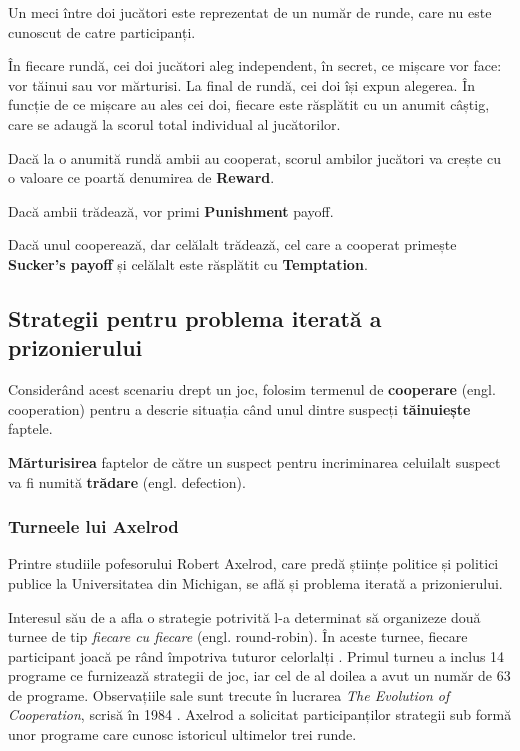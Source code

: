Un meci între doi jucători este reprezentat de un număr de runde, care nu este cunoscut de catre participanți.

În fiecare rundă, cei doi jucători aleg independent, în secret, ce mișcare vor face: vor tăinui sau vor mărturisi. La final de rundă, cei doi își expun alegerea. În funcție de ce mișcare au ales cei doi, fiecare este răsplătit cu un anumit câștig, care se adaugă la scorul total individual al jucătorilor. 

Dacă la o anumită rundă ambii au cooperat, scorul ambilor jucători va crește cu o valoare ce poartă denumirea de \textbf{Reward}. 

Dacă ambii trădează, vor primi \textbf{Punishment} payoff. 

Dacă unul cooperează, dar celălalt trădează, cel care a cooperat primește \textbf{Sucker's payoff} și celălalt este răsplătit cu \textbf{Temptation}. 

\subsection {Strategii pentru problema iterată a prizonierului}

Considerând acest scenariu drept un joc, folosim termenul de \textbf{cooperare} (engl. cooperation) pentru a descrie situația când unul dintre suspecți \textbf{tăinuiește} faptele. 

\textbf{Mărturisirea} faptelor de către un suspect pentru incriminarea celuilalt suspect va fi numită \textbf{trădare} (engl. defection). 

\subsubsection{Turneele lui Axelrod}

Printre studiile pofesorului Robert Axelrod, care predă științe politice și politici publice la Universitatea din Michigan, se află și problema iterată a prizonierului.

Interesul său de a afla o strategie potrivită l-a determinat să organizeze două turnee de tip \textit{fiecare cu fiecare} (engl. round-robin). În aceste turnee, fiecare participant joacă pe rând împotriva tuturor celorlalți \cite{round_robin_dictionary}. Primul turneu a inclus 14 programe ce furnizează strategii de joc, iar cel de al doilea a avut un număr de 63 de programe. Observațiile sale sunt trecute în lucrarea \textit{The Evolution of Cooperation}, scrisă în 1984 \cite{article_by_melanie_mitchell}. Axelrod a solicitat participanților strategii sub formă unor programe care cunosc istoricul ultimelor trei runde.

